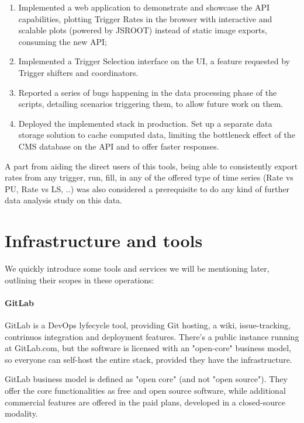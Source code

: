 \begin{enumerate}
\item Implemented a web application to demonstrate and showcase the API capabilities, plotting Trigger Rates in the browser with interactive and scalable plots (powered by JSROOT) instead of static image exports, consuming the new API;
\item Implemented a Trigger Selection interface on the UI, a feature requested by Trigger shifters and coordinators.
\item Reported a series of bugs happening in the data processing phase of the scripts, detailing scenarios triggering them, to allow future work on them.
\item Deployed the implemented stack in production. Set up a separate data storage solution to cache computed data, limiting the bottleneck effect of the CMS database on the API and to offer faster responses.

\end{enumerate}

A part from aiding the direct users of this tools, being able to consistently export rates from any trigger, run, fill, in any of the offered type of time series (Rate vs PU, Rate vs LS, ..) was also considered a prerequisite to do any kind of further data analysis study on this data.

\section{Infrastructure and tools}

We quickly introduce some tools and services we will be mentioning later, outlining their scopes in these operations:

\paragraph{GitLab}

GitLab is a DevOps lyfecycle tool, providing Git hosting, a wiki, issue-tracking, contrinuos integration and deployment features. There's a public instance running at GitLab.com, but the software is licensed with an "open-core" business model, so everyone can self-host the entire stack, provided they have the infrastructure.

GitLab business model is defined as "open core" (and not "open source"). They offer the core functionalities as free and open source software, while additional commercial features are offered in the paid plans, developed in a closed-source modality.

